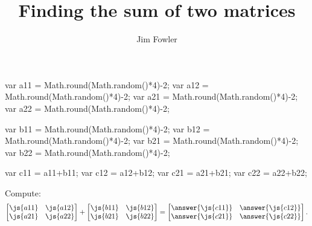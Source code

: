 \documentclass{ximera}
\title{Finding the sum of two matrices}
\author{Jim Fowler}
\begin{document}
\begin{javascript}
  var a11 = Math.round(Math.random()*4)-2;
  var a12 = Math.round(Math.random()*4)-2;
  var a21 = Math.round(Math.random()*4)-2;
  var a22 = Math.round(Math.random()*4)-2;

  var b11 = Math.round(Math.random()*4)-2;
  var b12 = Math.round(Math.random()*4)-2;
  var b21 = Math.round(Math.random()*4)-2;
  var b22 = Math.round(Math.random()*4)-2;

  var c11 = a11+b11;
  var c12 = a12+b12;
  var c21 = a21+b21;
  var c22 = a22+b22;
\end{javascript}

\begin{problem}
  Compute:
  \[
    \begin{bmatrix}
      \js{a11} & \js{a12} \\
      \js{a21} & \js{a22}
    \end{bmatrix}
    +
    \begin{bmatrix}
      \js{b11} & \js{b12} \\
      \js{b21} & \js{b22}
    \end{bmatrix} =
    \begin{bmatrix}
      \answer{\js{c11}} & \answer{\js{c12}} \\
      \answer{\js{c21}} & \answer{\js{c22}}
    \end{bmatrix}.    
  \]
\end{problem}
\end{document}
